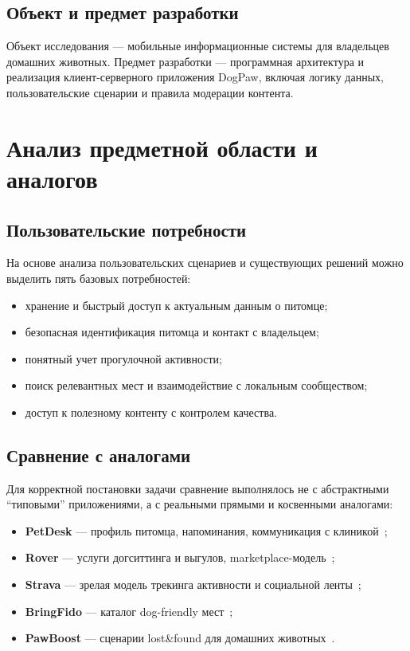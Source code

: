 \documentclass[12pt,a4paper]{article}
\begin{document}
\subsection{Объект и предмет разработки}

Объект исследования --- мобильные информационные системы для владельцев домашних животных.  
Предмет разработки --- программная архитектура и реализация клиент-серверного приложения DogPaw, включая логику данных, пользовательские сценарии и правила модерации контента.


\section{Анализ предметной области и аналогов}

\subsection{Пользовательские потребности}

На основе анализа пользовательских сценариев и существующих решений можно выделить пять базовых потребностей:
\begin{itemize}
  \item хранение и быстрый доступ к актуальным данным о питомце;
  \item безопасная идентификация питомца и контакт с владельцем;
  \item понятный учет прогулочной активности;
  \item поиск релевантных мест и взаимодействие с локальным сообществом;
  \item доступ к полезному контенту с контролем качества.
\end{itemize}

\subsection{Сравнение с аналогами}

Для корректной постановки задачи сравнение выполнялось не с абстрактными \enquote{типовыми} приложениями, а с реальными прямыми и косвенными аналогами:
\begin{itemize}
  \item \textbf{PetDesk} --- профиль питомца, напоминания, коммуникация с клиникой~\cite{petdesk};
  \item \textbf{Rover} --- услуги догситтинга и выгулов, marketplace-модель~\cite{rover};
  \item \textbf{Strava} --- зрелая модель трекинга активности и социальной ленты~\cite{strava};
  \item \textbf{BringFido} --- каталог dog-friendly мест~\cite{bringfido};
  \item \textbf{PawBoost} --- сценарии lost\&found для домашних животных~\cite{pawboost}.
\end{itemize}
\end{document}
